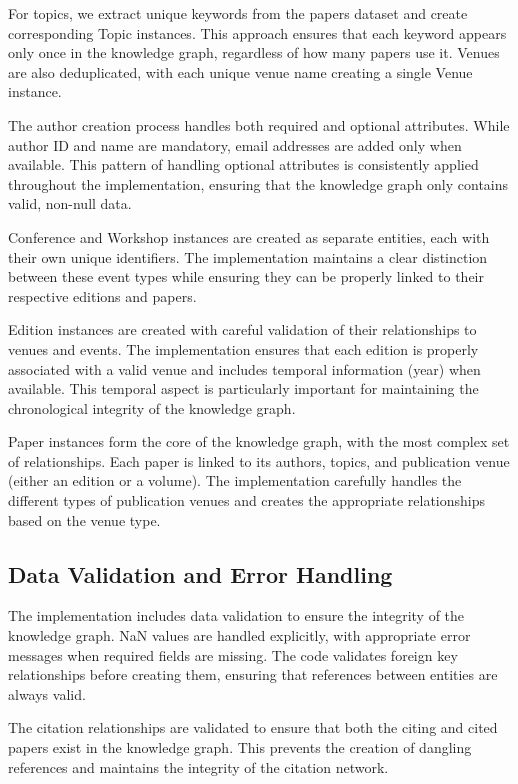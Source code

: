 \documentclass[10pt,a4paper]{article}
\begin{document}
For topics, we extract unique keywords from the papers dataset and create corresponding Topic instances. This approach ensures that each keyword appears only once in the knowledge graph, regardless of how many papers use it. Venues are also deduplicated, with each unique venue name creating a single Venue instance.

The author creation process handles both required and optional attributes. While author ID and name are mandatory, email addresses are added only when available. This pattern of handling optional attributes is consistently applied throughout the implementation, ensuring that the knowledge graph only contains valid, non-null data.

Conference and Workshop instances are created as separate entities, each with their own unique identifiers. The implementation maintains a clear distinction between these event types while ensuring they can be properly linked to their respective editions and papers.

Edition instances are created with careful validation of their relationships to venues and events. The implementation ensures that each edition is properly associated with a valid venue and includes temporal information (year) when available. This temporal aspect is particularly important for maintaining the chronological integrity of the knowledge graph.

Paper instances form the core of the knowledge graph, with the most complex set of relationships. Each paper is linked to its authors, topics, and publication venue (either an edition or a volume). The implementation carefully handles the different types of publication venues and creates the appropriate relationships based on the venue type.

\subsection{Data Validation and Error Handling}

The implementation includes data validation to ensure the integrity of the knowledge graph. NaN values are handled explicitly, with appropriate error messages when required fields are missing. The code validates foreign key relationships before creating them, ensuring that references between entities are always valid.

The citation relationships are validated to ensure that both the citing and cited papers exist in the knowledge graph. This prevents the creation of dangling references and maintains the integrity of the citation network.
\end{document}
